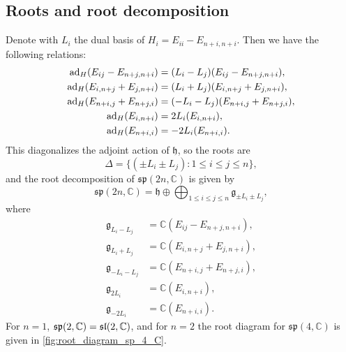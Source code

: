 \documentclass{report}
\begin{document}
\subsection{Roots and root decomposition}
Denote with $L_i$ the dual basis of $H_i = E_{ii} - E_{n+i,n+i}$.
Then we have the following relations:
\begin{align*}
    \operatorname{ad}_{H}(E_{ij} - E_{n+j,n+i}) &= (L_i - L_j)(E_{ij} - E_{n+j,n+i}),\\
    \operatorname{ad}_{H}(E_{i,n+j} + E_{j,n+i}) &= (L_i + L_j)(E_{i,n+j} + E_{j,n+i}),\\
    \operatorname{ad}_{H}(E_{n+i,j} + E_{n+j,i}) &= (-L_i - L_j)(E_{n+i,j} + E_{n+j,i}),\\
    \operatorname{ad}_{H}(E_{i,n+i}) &= 2L_i(E_{i,n+i}),\\
    \operatorname{ad}_{H}(E_{n+i,i}) &= -2L_i(E_{n+i,i}).
\end{align*}
This diagonalizes the adjoint action of $\mathfrak h$, so the roots are
\[
\Delta = \{ (\pm L_i \pm L_j) : 1 \leq i \leq j \leq n \},
\]
and the root decomposition of $\mathfrak{sp}(2n, \mathbb C)$ is given by
\[
\mathfrak{sp}(2n,\mathbb C) = \mathfrak h \oplus \bigoplus_{1 \leq i \leq j \leq n} \mathfrak g_{\pm L_i \pm L_j},
\]
where
\begin{align*}
    \mathfrak g_{L_i - L_j} &= \mathbb C \left( E_{ij} - E_{n+j,n+i} \right),\\
    \mathfrak g_{L_i + L_j} &= \mathbb C \left( E_{i,n+j} + E_{j,n+i} \right),\\
    \mathfrak g_{-L_i - L_j} &= \mathbb C \left( E_{n+i,j} + E_{n+j,i} \right),\\
    \mathfrak g_{2L_i} &= \mathbb C \left( E_{i,n+i} \right),\\
    \mathfrak g_{-2L_i} &= \mathbb C \left( E_{n+i,i} \right).
\end{align*}
For $n = 1$, $\operatorname{{\mathfrak{sp}}}(2, \mathbb C) = \mathfrak{sl}(2, \mathbb C)$, and for $n = 2$ the root diagram for $\mathfrak{sp}(4, \mathbb C)$ is given in \cref{fig:root_diagram_sp_4_C}.
\end{document}
